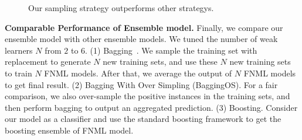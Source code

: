 \documentclass[conference]{IEEEtran}
\begin{document}
\begin{figure}[t]
\centering
{}
\vspace*{-10pt}
\caption{Our sampling strategy outperforms other strategys.}\label{fig:samplingstrategy}
\end{figure}

\textbf{Comparable Performance of Ensemble model.} 
Finally, we compare our ensemble model with other ensemble models. We tuned the number of weak learners $N$ from $2$ to $6$. (1) Bagging~\cite{Bagging}. We sample the training set with replacement to generate $N$ new training sets, and use these $N$ new training sets to train $N$ FNML models. After that, we average the output of $N$ FNML models to get final result. (2) Bagging With Over Simpling (BaggingOS). For a fair comparison, we also over-sample the positive instances in the training sets, and then perform bagging to output an aggregated prediction. (3) Boosting. Consider our model as a classifier and use the standard boosting framework to get the boosting ensemble of FNML model.  
\end{document}
